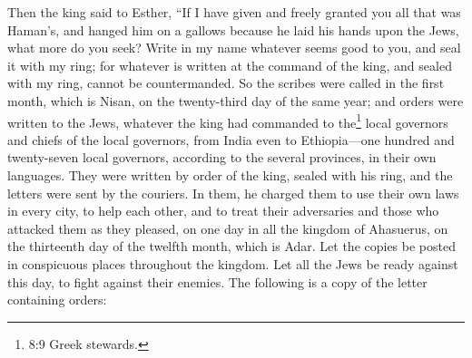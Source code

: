  Then the king said to Esther, ``If I have given and freely
granted you all that was Haman's, and hanged him on a gallows because he
laid his hands upon the Jews, what more do you seek?  Write
in my name whatever seems good to you, and seal it with my ring; for
whatever is written at the command of the king, and sealed with my ring,
cannot be countermanded.  So the scribes were called in the
first month, which is Nisan, on the twenty-third day of the same year;
and orders were written to the Jews, whatever the king had commanded to
the\footnote{8:9 Greek stewards.} local governors and chiefs of the
local governors, from India even to Ethiopia---one hundred and
twenty-seven local governors, according to the several provinces, in
their own languages.  They were written by order of the
king, sealed with his ring, and the letters were sent by the couriers.
 In them, he charged them to use their own laws in every
city, to help each other, and to treat their adversaries and those who
attacked them as they pleased,  on one day in all the
kingdom of Ahasuerus, on the thirteenth day of the twelfth month, which
is Adar.  Let the copies be posted in conspicuous places
throughout the kingdom. Let all the Jews be ready against this day, to
fight against their enemies. The following is a copy of the letter
containing orders:

